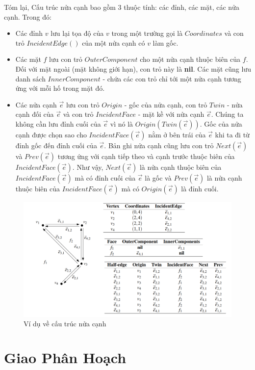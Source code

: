 \documentclass[15pt]{article}
\begin{document}
Tóm lại, Cấu trúc nửa cạnh bao gồm 3 thuộc tính: các đỉnh, các mặt, các nửa cạnh. Trong đó:
\begin{itemize}
    \item Các đỉnh $v$ lưu lại tọa độ của $v$ trong một trường gọi là $Coordinates$ và con trỏ $IncidentEdge()$ của một nửa cạnh có $v$ làm gốc.
    \item Các mặt $f$ lưu con trỏ $OuterComponent$ cho một  nửa cạnh thuộc biên của $f$. Đối với mặt ngoài (mặt không giới hạn), con trỏ này là \textbf{nil}. Các mặt cũng lưu danh sách $InnerComponent$ - chứa các con trỏ chỉ tới một nửa cạnh tương ứng với mỗi hố trong mặt đó.
    \item Các nửa cạnh $\vec{e}$ lưu con trỏ $Origin$ - gốc của nửa cạnh, con trỏ $Twin$ - nửa cạnh đối của $\vec{e}$ và con trỏ $IncidentFace$ - mặt kề với nửa cạnh $\vec{e}$. Chúng ta không cần lưu đỉnh cuối của $\vec{e}$ vì nó là $Origin(Twin(\vec{e}))$. Gốc của nửa cạnh được chọn sao cho $IncidentFace(\vec{e})$ nằm ở bên trái của $\vec{e}$ khi ta đi từ đỉnh gốc đến đỉnh cuối của $\vec{e}$. Bản ghi nửa cạnh cũng lưu con trỏ $Next(\vec{e})$ và $Prev(\vec{e})$ tương ứng với cạnh tiếp theo và cạnh trước thuộc biên của $IncidentFace(\vec{e})$. Như vậy, $Next(\vec{e})$ là nửa cạnh thuộc biên của  $IncidentFace(\vec{e})$ mà có đỉnh cuối của $\vec{e}$ là gốc và $Prev(\vec{e})$ là nửa cạnh thuộc biên của $IncidentFace(\vec{e})$ mà có $Origin(\vec{e})$ là đỉnh cuối.
\end{itemize}

\begin{figure}[h!]
\centering
\includegraphics[scale=0.5]{./dcel2.png}
\caption{Ví dụ về cấu trúc nửa cạnh}
\label{fig: ví dụ về cấu trúc nửa cạnh}
\end{figure}
\section{Giao Phân Hoạch}
\end{document}
